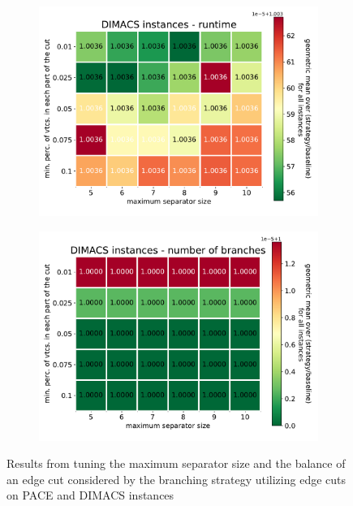 \documentclass[12pt,a4paper,twoside]{scrartcl}
\numberwithin{equation}{section}
\begin{document}
\begin{figure}[htb!]
	\begin{subfigure}{0.475\textwidth}
		\includegraphics[width=\textwidth]{images/plots/st_tune_dimacs_t2}
	\end{subfigure}
	\begin{subfigure}{0.475\textwidth}
		\includegraphics[width=\textwidth]{images/plots/st_tune_dimacs_b}
	\end{subfigure}
	\caption{Results from tuning the maximum separator size and the balance of an edge cut considered by the branching strategy utilizing edge cuts on PACE and DIMACS instances}	
	\label{st}
	
\end{figure}
\end{document}
